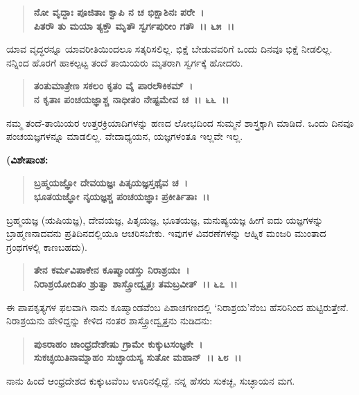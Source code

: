 \begin{verse}
\textbf{ನೋ ವೃದ್ದಾಃ ಪೂಜಿತಾಃ ಕ್ವಾಪಿ ನ ಚ ಭಿಕ್ಷಾಶಿನಃ ಪರೇ~।}\\\textbf{ಪಿತರೌ ತು ಮಯಾ ತ್ಯಕ್ತೌ ಮೃತೌ ಸ್ವರ್ಗಪುರೀಂ ಗತೌ~।। ೬೫~।।}
\end{verse}

ಯಾವ ವೃದ್ಧರನ್ನೂ ಯಾವರೀತಿಯಿಂದಲೂ ಸತ್ಕರಿಸಲಿಲ್ಲ. ಭಿಕ್ಷೆ ಬೇಡುವವರಿಗೆ ಒಂದು ದಿನವೂ ಭಿಕ್ಷೆ ನೀಡಲಿಲ್ಲ. ನನ್ನಿಂದ ಹೊರಗೆ ಹಾಕಲ್ಪಟ್ಟ ತಂದೆ ತಾಯಿಯರು ಮೃತರಾಗಿ ಸ್ವರ್ಗಕ್ಕೆ ಹೋದರು.

\begin{verse}
\textbf{ತಂತುಮಾತ್ರೇಣ ಸಕಲಂ ಕೃತಂ ವೈ ಪಾರಲೌಕಿಕಮ್~।}\\\textbf{ನ ಕೃತಾಃ ಪಂಚಯಜ್ಞಾಶ್ಚ ನಾಧೀತಂ ನೇಷ್ಟಮೇವ ಚ~।। ೬೬~।।}
\end{verse}

ನಮ್ಮ ತಂದೆ-ತಾಯಿಯರ ಉತ್ತರಕ್ರಿಯಾದಿಗಳನ್ನು ಹಣದ ಲೋಭದಿಂದ ಸುಮ್ಮನೆ ಶಾಸ್ತ್ರಕ್ಕಾಗಿ ಮಾಡಿದೆ. ಒಂದು ದಿನವೂ ಪಂಚಯಜ್ಞಗಳನ್ನೂ ಮಾಡಲಿಲ್ಲ. ವೇದಾಧ್ಯಯನ, ಯಜ್ಞಗಳಂತೂ ಇಲ್ಲವೇ ಇಲ್ಲ.

\begin{flushleft}
\textbf{(ವಿಶೇಷಾಂಶ:\enginline{-}}
\end{flushleft}

\begin{verse}
\textbf{ಬ್ರಹ್ಮಯಜ್ಞೋ ದೇವಯಜ್ಞಃ ಪಿತೃಯಜ್ಞಸ್ತಥೈವ ಚ~।}\\\textbf{ಭೂತಯಜ್ಞೋ ನೃಯಜ್ಞಶ್ಚ ಪಂಚಯಜ್ಞಾಃ ಪ್ರಕೀರ್ತಿತಾಃ~।।}
\end{verse}

ಬ್ರಹ್ಮಯಜ್ಞ (ಋಷಿಯಜ್ಞ), ದೇವಯಜ್ಞ, ಪಿತೃಯಜ್ಞ, ಭೂತಯಜ್ಞ, ಮನುಷ್ಯಯಜ್ಞ ಹೀಗೆ ಐದು ಯಜ್ಞಗಳನ್ನು ಬ್ರಾಹ್ಮಣನಾದವನು ಪ್ರತಿದಿನದಲ್ಲಿಯೂ ಆಚರಿಸಬೇಕು. ಇವುಗಳ ವಿವರಣೆಗಳನ್ನು ಆಹ್ನಿಕ ಮಂಜರಿ ಮುಂತಾದ ಗ್ರಂಥಗಳಲ್ಲಿ ಕಾಣಬಹದು).

\begin{verse}
\textbf{ತೇನ ಕರ್ಮವಿಪಾಕೇನ ಕೂಷ್ಮಾಂಡಸ್ತು ನಿರಾಶ್ರಯಃ~।}\\\textbf{ನಿರಾಶ್ರಯೋದಿತಂ ಶ್ರುತ್ವಾ ಶಾಸ್ತ್ರೋದ್ವೃತ್ತಃ ತಮಬ್ರವೀತ್~।। ೬೭~।।}
\end{verse}

ಈ ಪಾಪಕೃತ್ಯಗಳ ಫಲವಾಗಿ ನಾನು ಕೂಷ್ಮಾಂಡವೆಂಬ ಪಿಶಾಚಗಣದಲ್ಲಿ `ನಿರಾಶ್ರಯ'ನೆಂಬ ಹೆಸರಿನಿಂದ ಹುಟ್ಟಿರುತ್ತೇನೆ. ನಿರಾಶ್ರಯನು ಹೇಳಿದ್ದನ್ನು ಕೇಳಿದ ನಂತರ ಶಾಸ್ತ್ರೋದ್ವೃತ್ತನು ನುಡಿದನು:

\begin{verse}
\textbf{ಪುಽರಾಹಂ ಚಾಂಧ್ರದೇಶೇಷು ಗ್ರಾಮೇ ಕುಕ್ಕುಟಸಂಜ್ಞಕೇ~।}\\\textbf{ಸುಕಚ್ಛಯಿತಿನಾಮ್ನಾಹಂ ಸುಚ್ಛಾಯಸ್ಯ ಸುತೋ ಮಹಾನ್~।। ೬೮~।।}
\end{verse}

ನಾನು ಹಿಂದೆ ಆಂಧ್ರದೇಶದ ಕುಕ್ಕುಟವೆಂಬ ಊರಿನಲ್ಲಿದ್ದೆ. ನನ್ನ ಹೆಸರು ಸುಕಚ್ಛ, ಸುಚ್ಛಾಯನ ಮಗ.

